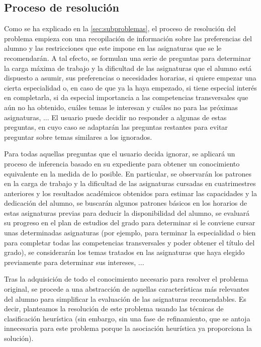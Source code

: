 
\subsection{Proceso de resolución} \label{sec:desc-resolucion}

Como se ha explicado en la \autoref{sec:subproblemas}, el proceso de 
resolución del problema empieza con una recopilación de información sobre las 
preferencias del alumno y las restricciones que este impone en las asignaturas 
que se le recomendarán. A tal efecto, se formulan una serie de preguntas para 
determinar la carga máxima de trabajo y la dificultad de las asignaturas que 
el alumno está dispuesto a asumir, sus preferencias o necesidades horarias, 
si quiere empezar una cierta especialidad o, en caso de que ya la haya 
empezado, si tiene especial interés en completarla, si da especial importancia 
a las competencias transversales que aún no ha obtenido, cuáles temas le 
interesan y cuáles no para las próximas asignaturas, ... El usuario puede 
decidir no responder a algunas de estas preguntas, en cuyo caso se adaptarán 
las preguntas restantes para evitar preguntar sobre temas similares a los 
ignorados.

Para todas aquellas preguntas que el usuario decida ignorar, se aplicará un 
proceso de inferencia basado en su expediente para obtener un conocimiento 
equivalente en la medida de lo posible. En particular, se observarán los 
patrones en la carga de trabajo y la dificultad de las asignaturas cursadas 
en cuatrimestres anteriores y los resultados académicos obtenidos para estimar 
las capacidades y la dedicación del alumno, se buscarán algunos patrones 
básicos en los horarios de estas asignaturas previas para deducir la 
disponibilidad del alumno, se evaluará su progreso en el plan de estudios del 
grado para determinar si le conviene cursar unas determinadas asignaturas 
(por ejemplo, para terminar la especialidad o bien para completar todas las 
competencias transversales y poder obtener el título del grado), se 
considerarán los temas tratados en las asignaturas que haya elegido 
previamente para determinar sus intereses, ...

Tras la adquisición de todo el conocimiento necesario para resolver el 
problema original, se procede a una abstracción de aquellas características 
más relevantes del alumno para simplificar la evaluación de las asignaturas 
recomendables. Es decir, planteamos la resolución de este problema usando las 
técnicas de clasificación heurística (sin embargo, sin una fase de 
refinamiento, que se antoja innecesaria para este problema porque la 
asociación heurística ya proporciona la solución).

